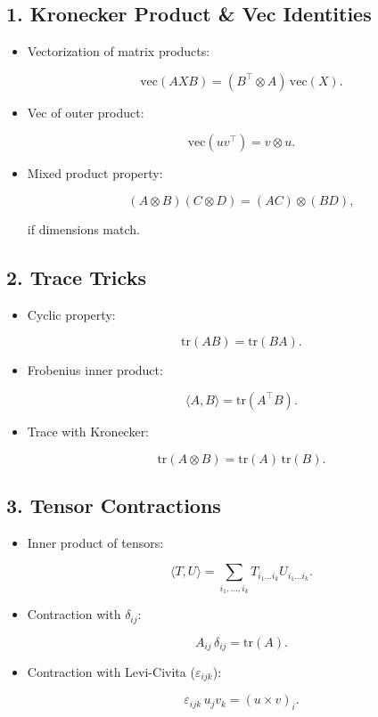 \documentclass[
  letterpaper,
  DIV=11,
  numbers=noendperiod]{scrreprt}
\begin{document}
\subsection{1. Kronecker Product \& Vec
Identities}\label{kronecker-product-vec-identities}

\begin{itemize}
\item
  Vectorization of matrix products:

  \[
  \mathrm{vec}(AXB) = (B^\top \otimes A)\, \mathrm{vec}(X).
  \]
\item
  Vec of outer product:

  \[
  \mathrm{vec}(uv^\top) = v \otimes u.
  \]
\item
  Mixed product property:

  \[
  (A \otimes B)(C \otimes D) = (AC) \otimes (BD),
  \]

  if dimensions match.
\end{itemize}

\subsection{2. Trace Tricks}\label{trace-tricks}

\begin{itemize}
\item
  Cyclic property:

  \[
  \mathrm{tr}(AB) = \mathrm{tr}(BA).
  \]
\item
  Frobenius inner product:

  \[
  \langle A,B \rangle = \mathrm{tr}(A^\top B).
  \]
\item
  Trace with Kronecker:

  \[
  \mathrm{tr}(A \otimes B) = \mathrm{tr}(A)\, \mathrm{tr}(B).
  \]
\end{itemize}

\subsection{3. Tensor Contractions}\label{tensor-contractions}

\begin{itemize}
\item
  Inner product of tensors:

  \[
  \langle T, U \rangle = \sum_{i_1,\dots,i_k} T_{i_1\dots i_k} U_{i_1\dots i_k}.
  \]
\item
  Contraction with \(\delta_{ij}\):

  \[
  A_{ij}\,\delta_{ij} = \mathrm{tr}(A).
  \]
\item
  Contraction with Levi-Civita (\(\varepsilon_{ijk}\)):

  \[
  \varepsilon_{ijk}\, u_j v_k = (u \times v)_i.
  \]
\end{itemize}
\end{document}
